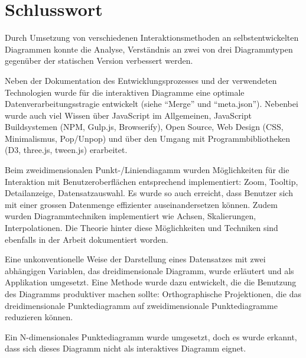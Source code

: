 \chapter{Schlusswort}

Durch Umsetzung von verschiedenen Interaktionsmethoden an selbstentwickelten Diagrammen konnte die Analyse, Verständnis an zwei von drei Diagrammtypen gegenüber der statischen Version verbessert werden.

Neben der Dokumentation des Entwicklungsprozesses und der verwendeten Technologien wurde für die interaktiven Diagramme eine optimale Datenverarbeitungsstragie entwickelt (siehe "`Merge"' und "`meta.json"'). Nebenbei wurde auch viel Wissen über JavaScript im Allgemeinen, JavaScript Buildsystemen (NPM, Gulp.js, Browserify), Open Source, Web Design (CSS, Minimalismus, Pop/Unpop) und über den Umgang mit Programmbibliotheken (D3, three.js, tween.js) erarbeitet.

Beim zweidimensionalen Punkt-/Liniendiagamm wurden Möglichkeiten für die Interaktion mit Benutzeroberflächen entsprechend implementiert: Zoom, Tooltip, Detailanzeige, Datensatzauswahl. Es wurde so auch erreicht, dass Benutzer sich mit einer grossen Datenmenge effizienter auseinandersetzen können. Zudem wurden Diagrammtechniken implementiert wie Achsen, Skalierungen, Interpolationen. Die Theorie hinter diese Möglichkeiten und Techniken sind ebenfalls in der Arbeit dokumentiert worden.

Eine unkonventionelle Weise der Darstellung eines Datensatzes mit zwei abhängigen Variablen, das dreidimensionale Diagramm, wurde erläutert und als Applikation umgesetzt. Eine Methode wurde dazu entwickelt, die die Benutzung des Diagramms produktiver machen sollte: Orthographische Projektionen, die das dreidimensionale Punktediagramm auf zweidimensionale Punktediagramme reduzieren können.

Ein N-dimensionales Punktediagramm wurde umgesetzt, doch es wurde erkannt, dass sich dieses Diagramm nicht als interaktives Diagramm eignet.


